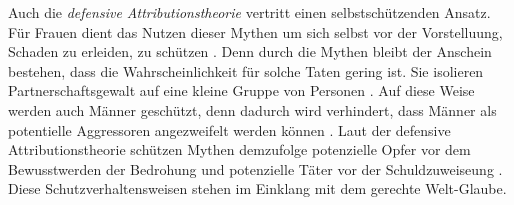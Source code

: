 Auch die \textit{defensive Attributionstheorie} vertritt einen selbstschützenden Ansatz. Für Frauen dient das Nutzen dieser Mythen um sich selbst vor der Vorstelluung, Schaden zu erleiden, zu schützen \parencite{DVMAS, DVMAS_Peters}. Denn durch die Mythen bleibt der Anschein bestehen, dass die Wahrscheinlichkeit für solche Taten gering ist. Sie isolieren Partnerschaftsgewalt auf eine kleine Gruppe von Personen \parencite{DVMAS}. Auf diese Weise werden auch Männer geschützt, denn dadurch wird verhindert, dass Männer als potentielle Aggressoren angezweifelt werden können \parencite{DVMAS, DVMAS_Peters}. Laut der defensive Attributionstheorie schützen Mythen demzufolge potenzielle Opfer vor dem Bewusstwerden der Bedrohung und potenzielle Täter vor der Schuldzuweiseung \parencite{DVMAS_Peters}. Diese Schutzverhaltensweisen stehen im Einklang mit dem gerechte Welt-Glaube.